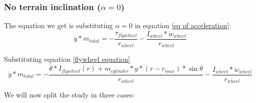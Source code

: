 \subsubsection{No terrain inclination ($\alpha = 0$)}
The equation we get is substituting $\alpha = 0$ in equation \ref{eq of acceleration}:
\[\ddot{y}*m_{total} = - \frac{\tau_{flywheel}}{r_{wheel}} - \frac{I_{wheel} * \dot{w}_{wheel}}{r_{wheel}}\]

Substituting equation \ref{flywheel equation}
\begin{equation}\label{no inclintation eq}
    \ddot{y}*m_{total} = - \frac{\ddot{\theta}*I_{flywheel}(r) + m_{cylinder} * g * (r - r_{max}) * \sin{\theta}}{r_{wheel}} - \frac{I_{wheel} * \dot{w}_{wheel}}{r_{wheel}}
\end{equation}


We will now split the study in  three cases:
